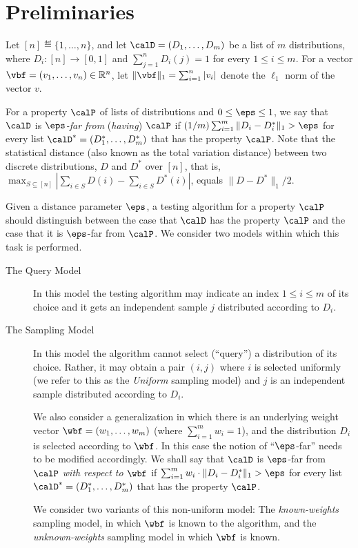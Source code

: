 \section{Preliminaries}\label{prel.sec}

Let $[n]\eqdef \{1,\ldots,n\}$, and let
$\calD = (D_1,\ldots,D_m)$ be a list of $m$ distributions,
where $D_i : [n] \to [0,1]$ and $\sum_{j=1}^n D_i(j) =1$
for every $1 \leq i \leq m$.
For a vector $\vbf = (v_1,\ldots,v_n) \in \mathbb{R}^n$,
let $\|\vbf\|_1 = \sum_{i=1}^n |v_i|$ denote the
$\ell_1$ norm of the vector $v$.

%
For a property  $\calP$ of lists of distributions and
$0 \leq \eps \leq 1$, we say that
$\calD$ is {\em $\eps$-far from\/} (\emph{having}) $\calP$ if
$({1}/{m}) \sum_{i=1}^m \|D_i - D^*_i\|_1 > \eps$
for every list $\calD^* = (D^*_1,\ldots,D^*_m)$
that has the property $\calP$. Note that
the statistical distance (also known as the total variation distance)
between two discrete distributions, $D$ and $D^*$ over $[n]$,
that is,
$\max_{S\subseteq [n]} \left| \sum_{i\in S} D(i) -\sum_{i\in S} D^*(i)\right|$,
 equals $\|D - D^*\|_1/2$.

Given a distance parameter $\eps$,
a testing algorithm for a property $\calP$
%
should distinguish between the case that $\calD$ has the property
$\calP$ and the case that it is $\eps$-far from $\calP$. We consider
two models within which this task is performed.
\begin{description}
\item[The Query Model]
In this model the testing algorithm may indicate an index $1 \leq i \leq m$ of
its choice and it gets an independent sample $j$ distributed according to $D_i$.
\item[The Sampling Model]
In this model the algorithm cannot select (``query'') a distribution of
its choice. Rather, it may obtain a pair $(i,j)$ where $i$ is selected
uniformly (we refer to this as the \emph{Uniform} sampling model)
and $j$ is an independent sample distributed according to $D_i$.

We also consider a generalization in which there is an underlying
weight vector $\wbf = (w_1,\ldots,w_m)$ (where $\sum_{i=1}^m w_i = 1$),
and the distribution $D_i$ is selected according to $\wbf$.
In this case the notion of ``$\eps$-far'' %
needs to be modified accordingly.
%
We shall say  %
that $\calD$ is $\eps$-far from $\calP$ \emph{with respect to $\wbf$}
if $\sum_{i=1}^m w_i\cdot \|D_i - D^*_i\|_1 > \eps $
for every list $\calD^* = (D^*_1,\ldots,D^*_m)$
that has the property $\calP$.

We consider two variants of this non-uniform model:
The \emph{known-weights} sampling model, in which $\wbf$ is known
to the algorithm, and the \emph{unknown-weights} sampling model
in which $\wbf$ is known.
%
%
%
%
%
\end{description}


